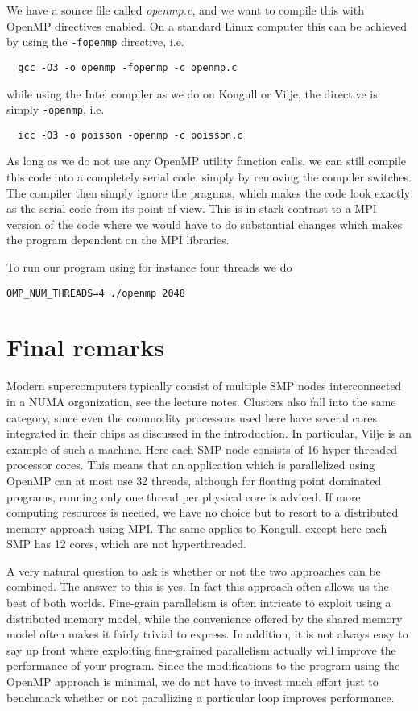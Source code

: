 We have a source file called \emph{openmp.c}, and we want to compile this with
OpenMP directives enabled. On a standard Linux computer this can be achieved by
using the \texttt{-fopenmp} directive, i.e.
\begin{lstlisting}
  gcc -O3 -o openmp -fopenmp -c openmp.c
\end{lstlisting}
while using the Intel compiler as we do on Kongull or Vilje, the directive is
simply \texttt{-openmp}, i.e.
\begin{lstlisting}
  icc -O3 -o poisson -openmp -c poisson.c
\end{lstlisting}
As long as we do not use any OpenMP utility function calls, we can still compile
this code into a completely serial code, simply by removing the compiler
switches. The compiler then simply ignore the pragmas, which makes the code look
exactly as the serial code from its point of view. This is in stark contrast to
a MPI version of the code where we would have to do substantial changes which
makes the program dependent on the MPI libraries.

To run our program using for instance four threads we do
\begin{lstlisting}[style=c]
  OMP_NUM_THREADS=4 ./openmp 2048
\end{lstlisting}

\section{Final remarks}

Modern supercomputers typically consist of multiple SMP nodes interconnected in
a NUMA organization, see the lecture notes. Clusters also fall into the same
category, since even the commodity processors used here have several cores
integrated in their chips as discussed in the introduction. In particular, Vilje
is an example of such a machine. Here each SMP node consists of 16
hyper-threaded processor cores. This means that an application which is
parallelized using OpenMP can at most use 32 threads, although for floating
point dominated programs, running only one thread per physical core is adviced.
If more computing resources is needed, we have no choice but to resort to a
distributed memory approach using MPI. The same applies to Kongull, except here
each SMP has 12 cores, which are not hyperthreaded.

A very natural question to ask is whether or not the two approaches can be
combined. The answer to this is yes. In fact this approach often allows us the
best of both worlds. Fine-grain parallelism is often intricate to exploit using
a distributed memory model, while the convenience offered by the shared memory
model often makes it fairly trivial to express. In addition, it is not always
easy to say up front where exploiting fine-grained parallelism actually will
improve the performance of your program. Since the modifications to the program
using the OpenMP approach is minimal, we do not have to invest much effort just
to benchmark whether or not parallizing a particular loop improves performance.


